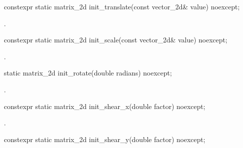 \begin{itemdecl}
constexpr static matrix_2d init_translate(const vector_2d& value) noexcept;
\end{itemdecl}
\begin{itemdescr}
\pnum
\returns
{}.
\end{itemdescr}

\begin{itemdecl}
constexpr static matrix_2d init_scale(const vector_2d& value) noexcept;
\end{itemdecl}
\begin{itemdescr}
\pnum
\returns
{}.
\end{itemdescr}

\begin{itemdecl}
static matrix_2d init_rotate(double radians) noexcept;
\end{itemdecl}
\begin{itemdescr}
\pnum
\returns
{}.
\end{itemdescr}

\begin{itemdecl}
constexpr static matrix_2d init_shear_x(double factor) noexcept;
\end{itemdecl}
\begin{itemdescr}
\pnum
\returns
{}.
\end{itemdescr}

\begin{itemdecl}
constexpr static matrix_2d init_shear_y(double factor) noexcept;
\end{itemdecl}
\begin{itemdescr}
\pnum
\returns
{}
\end{itemdescr}

